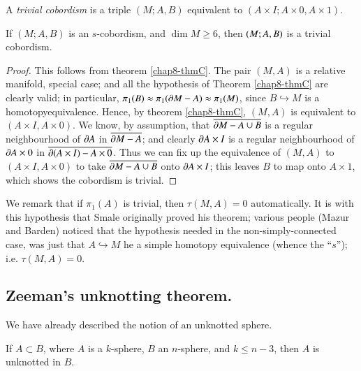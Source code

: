A {\em trivial cobordism} is a triple $(M;A,B)$ equivalent to $(A\times I;A\times 0,A\times 1)$.

\begin{theorem*}
If $(M;A,B)$ is an $s$-cobordism, and $\dim M\geq 6$, then $(M;\break A,B)$
is a trivial cobordism. 
\end{theorem*}

\begin{proof}
This follows from theorem \ref{chap8-thmC}. The pair $(M,A)$ is a relative manifold, special case; and all the hypothesis of Theorem \ref{chap8-thmC} are clearly valid; in particular, $\pi_{1}(B)\approx \pi_{1}(\partial M-A)\approx \pi_{1}(M)$, since $B\hookrightarrow M$ is a homotopy\pageoriginale equivalence. Hence, by theorem \ref{chap8-thmC}, $(M,A)$ is equivalent to $(A\times I,A\times 0)$. We know, by assumption, that $\overline{\partial M-A\cup B}$ is a regular neighbourhood of $\partial A$ in $\overline{\partial M-A}$; and clearly $\partial A\times I$ is a regular neighbourhood of $\partial A\times 0$ in $\overline{\partial (A\times I)-A\times 0}$. Thus we can fix 
up the equivalence of $(M,A)$ to $(A\times I, A\times 0)$ to take $\overline{\partial M-A\cup B}$ onto $\partial A\times I$; this leaves $B$ to map onto $A\times 1$, which shows the cobordism is trivial.
\end{proof}

We remark that if $\pi_{1}(A)$ is trivial, then $\tau(M,A)=0$ automatically. It is with this hypothesis that Smale originally proved his theorem; various people (Mazur and Barden) noticed that the hypothesis needed in the non-simply-connected case, was just that $A\hookrightarrow M$ he a simple homotopy equivalence (whence the ``$s$''); i.e. $\tau(M,A)=0$.

\subsection{Zeeman's unknotting theorem.}\label{chap8-sec8.3.5}
We have already described the notion of an unknotted sphere.

\begin{theorem*}
If $A\subset B$, where $A$ is a $k$-sphere, $B$ an $n$-sphere, and $k\leq n-3$, then $A$ is unknotted in $B$.
\end{theorem*}

